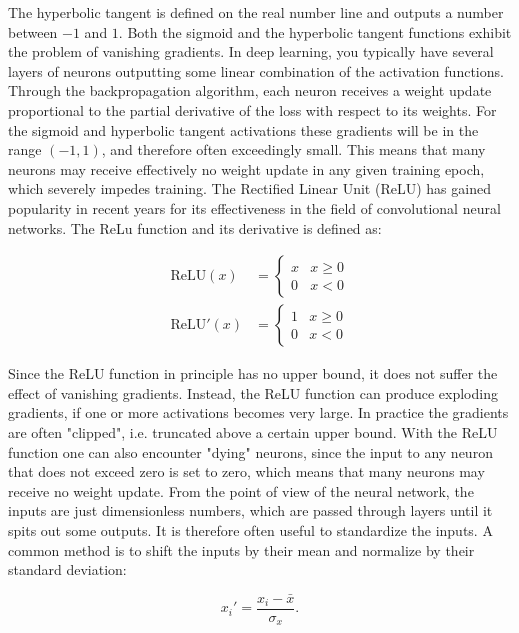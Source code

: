 The hyperbolic tangent is defined on the real number line and outputs
a number between $-1$ and $1$.
Both the sigmoid and the hyperbolic tangent functions exhibit the problem
of vanishing gradients. In deep learning, you typically have several layers
of neurons outputting some linear combination of the activation functions.
Through the backpropagation algorithm, each neuron receives a weight update
proportional to the partial derivative of the loss with respect to
its weights. For the sigmoid and hyperbolic tangent activations these
gradients will be in the range $(-1, 1)$, and therefore often
exceedingly small. This means that many neurons may receive effectively
no weight update in any given training epoch, which severely impedes training.
The Rectified Linear Unit (ReLU) has gained popularity in recent years
for its effectiveness in the field of convolutional neural networks.
The ReLu function and its derivative is defined as:

\begin{equation}
    \begin{split}
        \text{ReLU}(x) &=
    \begin{cases}
        x & x \geq 0 \\
        0 & x < 0
    \end{cases} \\
        \text{ReLU}'(x) &=
    \begin{cases}
        1 & x \geq 0 \\
        0 & x < 0
    \end{cases}
    \end{split}
\end{equation}

Since the ReLU function in principle has no upper bound, it does
not suffer the effect of vanishing gradients. Instead, the ReLU function
can produce exploding gradients, if one or more activations becomes
very large. In practice the gradients are often "clipped", i.e.
truncated above a certain upper bound.
With the ReLU function one can also encounter "dying" neurons,
since the input to any neuron that does not exceed zero
is set to zero, which means that many neurons may receive
no weight update.
From the point of view of the neural network, the inputs are just
dimensionless numbers, which are passed through layers until it spits
out some outputs. It is therefore often useful to standardize the inputs.
A common method is to shift the inputs by their mean and
normalize by their standard deviation:

\begin{equation}
 x_{i}' = \frac{x_{i} - \bar{x}}{\sigma_x} . 
\end{equation}

